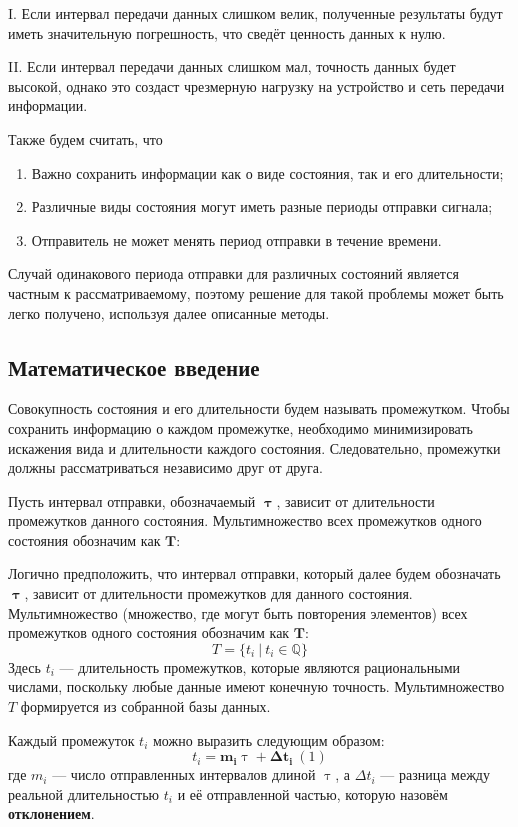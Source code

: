 \documentclass[12pt]{report}
\let\tau\uptau
\begin{document}
\quad I. Если интервал передачи данных слишком велик, полученные результаты будут иметь значительную погрешность, что сведёт ценность данных к нулю.

\quad II. Если интервал передачи данных слишком мал, точность данных будет высокой, однако это создаст чрезмерную нагрузку на устройство и сеть передачи информации.

Также будем считать, что
\begin{enumerate}[label=\asbuk*),ref=\asbuk*]
    \item Важно сохранить информации как о виде состояния, так и его длительности;
    \item Различные виды состояния могут иметь разные периоды отправки сигнала;
    \item Отправитель не может менять период отправки в течение времени.
    \label{sec:c}
\end{enumerate}
Случай одинакового периода отправки для различных состояний является частным к рассматриваемому, поэтому решение для такой проблемы может быть легко получено, используя далее описанные методы.

\subsection{Математическое введение}
Совокупность состояния и его длительности будем называть промежутком. Чтобы сохранить информацию о каждом промежутке, необходимо минимизировать искажения вида и длительности каждого состояния. Следовательно, промежутки должны рассматриваться независимо друг от друга.

Пусть интервал отправки, обозначаемый $\bm{\tau}$, зависит от длительности промежутков данного состояния. Мультимножество всех промежутков одного состояния обозначим как $\bm{T}$:

Логично предположить, что интервал отправки, который далее будем обозначать $\bm{\tau}$, зависит от длительности промежутков для данного состояния. Мультимножество (множество, где могут быть повторения элементов) всех промежутков одного состояния обозначим как $\bm{T}$:
$$T=\{t_i\ |\ t_i\in \mathbb{Q}\}$$
Здесь $t_i$ — длительность промежутков, которые являются рациональными числами, поскольку любые данные имеют конечную точность. Мультимножество $T$ формируется из собранной базы данных.

Каждый промежуток $t_i$ можно выразить следующим образом:
$$t_i=\bm{m_i} \tau+\bm{\Delta t_i}\ (1)$$
где $m_i$ — число отправленных интервалов длиной $\tau$, а $\Delta t_i$ — разница между реальной длительностью $t_i$ и её отправленной частью, которую назовём \textbf{отклонением}.
\end{document}
